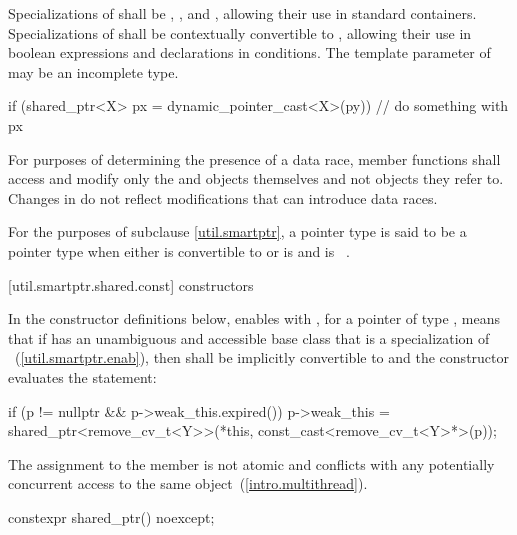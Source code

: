 \pnum
Specializations of  shall be ,
, and , allowing their use in standard
containers. Specializations of  shall be
contextually convertible to ,
allowing their use in boolean expressions and declarations in conditions. The template
parameter  of  may be an incomplete type.

\pnum
\begin{example}
\begin{codeblock}
if (shared_ptr<X> px = dynamic_pointer_cast<X>(py)) {
  // do something with px
}
\end{codeblock}
\end{example}

\pnum
For purposes of determining the presence of a data race, member functions shall
access and modify only the  and  objects
themselves and not objects they refer to. Changes in  do not
reflect modifications that can introduce data races.

\pnum
For the purposes of subclause \ref{util.smartptr},
a pointer type  is said to be
a pointer type  when either
 is convertible to  or
 is  and  is \cv{}~.

[util.smartptr.shared.const]{ constructors}

\pnum
In the constructor definitions below,
enables  with ,
for a pointer  of type ,
means that if  has an unambiguous and accessible base class
that is a specialization of ~(\ref{util.smartptr.enab}),
then  shall be implicitly convertible to  and
the constructor evaluates the statement:
\begin{codeblock}
if (p != nullptr && p->weak_this.expired())
  p->weak_this = shared_ptr<remove_cv_t<Y>>(*this, const_cast<remove_cv_t<Y>*>(p));
\end{codeblock}
The assignment to the  member is not atomic and
conflicts with any potentially concurrent access to the same object~(\ref{intro.multithread}).

%
\begin{itemdecl}
constexpr shared_ptr() noexcept;
\end{itemdecl}


